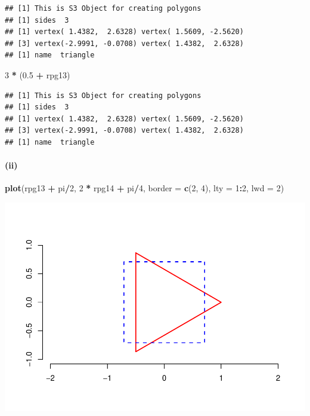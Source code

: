 \documentclass[]{article}
\newenvironment{Shaded}{\begin{snugshade}}{\end{snugshade}}
\newcommand{\KeywordTok}[1]{\textcolor[rgb]{0.13,0.29,0.53}{\textbf{#1}}}
\newcommand{\DataTypeTok}[1]{\textcolor[rgb]{0.13,0.29,0.53}{#1}}
\newcommand{\DecValTok}[1]{\textcolor[rgb]{0.00,0.00,0.81}{#1}}
\newcommand{\FloatTok}[1]{\textcolor[rgb]{0.00,0.00,0.81}{#1}}
\newcommand{\StringTok}[1]{\textcolor[rgb]{0.31,0.60,0.02}{#1}}
\newcommand{\OperatorTok}[1]{\textcolor[rgb]{0.81,0.36,0.00}{\textbf{#1}}}
\newcommand{\NormalTok}[1]{#1}
\let\oldparagraph\paragraph
\renewcommand{\paragraph}[1]{\oldparagraph{#1}\mbox{}}
\begin{document}
\begin{verbatim}
## [1] This is S3 Object for creating polygons
## [1] sides  3
## [1] vertex( 1.4382,  2.6328) vertex( 1.5609, -2.5620)
## [3] vertex(-2.9991, -0.0708) vertex( 1.4382,  2.6328)
## [1] name  triangle
\end{verbatim}

\begin{Shaded}
\begin{Highlighting}[]
\DecValTok{3} \OperatorTok{*}\StringTok{ }\NormalTok{(}\FloatTok{0.5} \OperatorTok{+}\StringTok{ }\NormalTok{rpg13)}
\end{Highlighting}
\end{Shaded}

\begin{verbatim}
## [1] This is S3 Object for creating polygons
## [1] sides  3
## [1] vertex( 1.4382,  2.6328) vertex( 1.5609, -2.5620)
## [3] vertex(-2.9991, -0.0708) vertex( 1.4382,  2.6328)
## [1] name  triangle
\end{verbatim}

\paragraph{(ii)}\label{ii}

\begin{Shaded}
\begin{Highlighting}[]
\KeywordTok{plot}\NormalTok{(rpg13 }\OperatorTok{+}\StringTok{ }\NormalTok{pi}\OperatorTok{/}\DecValTok{2}\NormalTok{, }\DecValTok{2} \OperatorTok{*}\StringTok{ }\NormalTok{rpg14 }\OperatorTok{+}\StringTok{ }\NormalTok{pi}\OperatorTok{/}\DecValTok{4}\NormalTok{, }\DataTypeTok{border =} \KeywordTok{c}\NormalTok{(}\DecValTok{2}\NormalTok{, }\DecValTok{4}\NormalTok{), }\DataTypeTok{lty =} \DecValTok{1}\OperatorTok{:}\DecValTok{2}\NormalTok{, }\DataTypeTok{lwd =} \DecValTok{2}\NormalTok{)}
\end{Highlighting}
\end{Shaded}

\includegraphics{Assigment4_files/figure-latex/unnamed-chunk-12-1.pdf}
\end{document}
